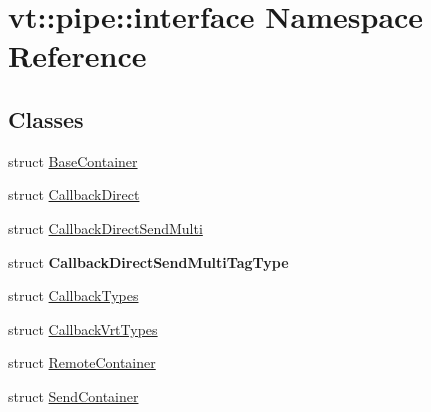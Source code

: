 \hypertarget{namespacevt_1_1pipe_1_1interface}{}\section{vt\+:\+:pipe\+:\+:interface Namespace Reference}
\label{namespacevt_1_1pipe_1_1interface}
\subsection*{Classes}
\begin{DoxyCompactItemize}
\item 
struct \hyperlink{structvt_1_1pipe_1_1interface_1_1_base_container}{Base\+Container}
\item 
struct \hyperlink{structvt_1_1pipe_1_1interface_1_1_callback_direct}{Callback\+Direct}
\item 
struct \hyperlink{structvt_1_1pipe_1_1interface_1_1_callback_direct_send_multi}{Callback\+Direct\+Send\+Multi}
\item 
struct {\bfseries Callback\+Direct\+Send\+Multi\+Tag\+Type}
\item 
struct \hyperlink{structvt_1_1pipe_1_1interface_1_1_callback_types}{Callback\+Types}
\item 
struct \hyperlink{structvt_1_1pipe_1_1interface_1_1_callback_vrt_types}{Callback\+Vrt\+Types}
\item 
struct \hyperlink{structvt_1_1pipe_1_1interface_1_1_remote_container}{Remote\+Container}
\item 
struct \hyperlink{structvt_1_1pipe_1_1interface_1_1_send_container}{Send\+Container}
\end{DoxyCompactItemize}
